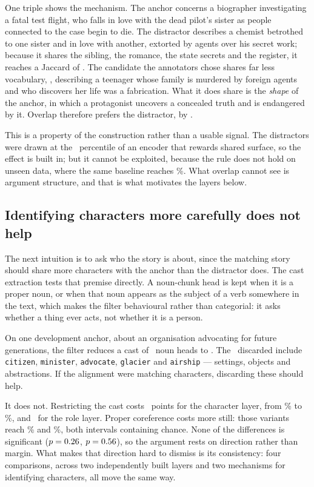 \documentclass[11pt,letterpaper,twocolumn]{article}
\begin{document}
One triple shows the mechanism. The anchor concerns a biographer investigating
a fatal test flight, who falls in love with the dead pilot's sister as people
connected to the case begin to die. The distractor describes a chemist
betrothed to one sister and in love with another, extorted by agents over his
secret work; because it shares the sibling, the romance, the state secrets and
the register, it reaches a Jaccard of \ExampleJaccardWrong. The candidate the
annotators chose shares far less vocabulary, \ExampleJaccardRight, describing a
teenager whose family is murdered by foreign agents and who discovers her life
was a fabrication. What it does share is the \emph{shape} of the anchor, in
which a protagonist uncovers a concealed truth and is endangered by it. Overlap
therefore prefers the distractor, by \ExampleJaccardGap.

This is a property of the construction rather than a usable signal. The
distractors were drawn at the \DistractorPercentile\ percentile of an encoder
that rewards shared surface, so the effect is built in; but it cannot be
exploited, because the rule does not hold on unseen data, where the same
baseline reaches \JaccardTestAcc\%. What overlap cannot see is argument
structure, and that is what motivates the layers below.

\subsection{Identifying characters more carefully does not help}
The next intuition is to ask who the story is about, since the matching story
should share more characters with the anchor than the distractor does. The cast
extraction tests that premise directly. A noun-chunk head is kept when it is a
proper noun, or when that noun appears as the subject of a verb somewhere in
the text, which makes the filter behavioural rather than categorial: it asks
whether a thing ever acts, not whether it is a person.

On one development anchor, about an organisation advocating for future
generations, the filter reduces a cast of \ExampleCastFull\ noun heads to
\ExampleCastActors. The \ExampleCastRemoved\ discarded include
\texttt{citizen}, \texttt{minister}, \texttt{advocate}, \texttt{glacier} and
\texttt{airship} --- settings, objects and abstractions. If the alignment were
matching characters, discarding these should help.

It does not. Restricting the cast costs \McnLThreeNVsLThreeNActorsDiff\ points
for the character layer, from \LThreeNAcc\% to \LThreeNActorsAcc\%, and
\McnLFourNVsLFourNActorsDiff\ for the role layer. Proper coreference costs more still: those
variants reach \LThreeAcc\% and \LFourAcc\%, both intervals containing
chance. None of the differences is significant
($p = 0.26$, $p = 0.56$), so the
argument rests on direction rather than margin. What makes that direction hard to dismiss is its
consistency: four comparisons, across two independently built layers and two
mechanisms for identifying characters, all move the same way.
\end{document}
